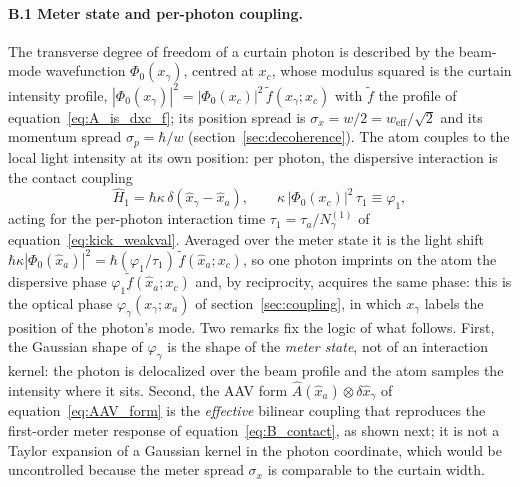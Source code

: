 \documentclass[11pt,a4paper]{article}
\begin{document}
\paragraph{B.1 Meter state and per-photon coupling.} The transverse degree of freedom of a curtain photon is described by the beam-mode wavefunction $\Phi_0(x_\gamma)$, centred at $x_c$, whose modulus squared is the curtain intensity profile, $|\Phi_0(x_\gamma)|^2 = |\Phi_0(x_c)|^2\,\tilde{f}(x_\gamma; x_c)$ with $\tilde{f}$ the profile of equation~\eqref{eq:A_is_dxc_f}; its position spread is $\sigma_x = w/2 = w_\text{eff}/\sqrt{2}$ and its momentum spread $\sigma_p = \hbar/w$ (section~\ref{sec:decoherence}). The atom couples to the local light intensity at its own position: per photon, the dispersive interaction is the contact coupling
\begin{equation}
\hat{H}_1 = \hbar\kappa\,\delta(\hat{x}_\gamma - \hat{x}_a), \qquad \kappa\,|\Phi_0(x_c)|^2\,\tau_1 \equiv \varphi_1,
\label{eq:B_contact}
\end{equation}
acting for the per-photon interaction time $\tau_1 = \tau_a/N_\gamma^{(1)}$ of equation~\eqref{eq:kick_weakval}. Averaged over the meter state it is the light shift $\hbar\kappa|\Phi_0(\hat{x}_a)|^2 = \hbar(\varphi_1/\tau_1)\,\tilde{f}(\hat{x}_a; x_c)$, so one photon imprints on the atom the dispersive phase $\varphi_1\tilde{f}(\hat{x}_a; x_c)$ and, by reciprocity, acquires the same phase: this is the optical phase $\varphi_\gamma(x_\gamma; x_a)$ of section~\ref{sec:coupling}, in which $x_\gamma$ labels the position of the photon's mode. Two remarks fix the logic of what follows. First, the Gaussian shape of $\varphi_\gamma$ is the shape of the \emph{meter state}, not of an interaction kernel: the photon is delocalized over the beam profile and the atom samples the intensity where it sits. Second, the AAV form $\hat{A}(\hat{x}_a)\otimes\delta\hat{x}_\gamma$ of equation~\eqref{eq:AAV_form} is the \emph{effective} bilinear coupling that reproduces the first-order meter response of equation~\eqref{eq:B_contact}, as shown next; it is not a Taylor expansion of a Gaussian kernel in the photon coordinate, which would be uncontrolled because the meter spread $\sigma_x$ is comparable to the curtain width.
\end{document}

